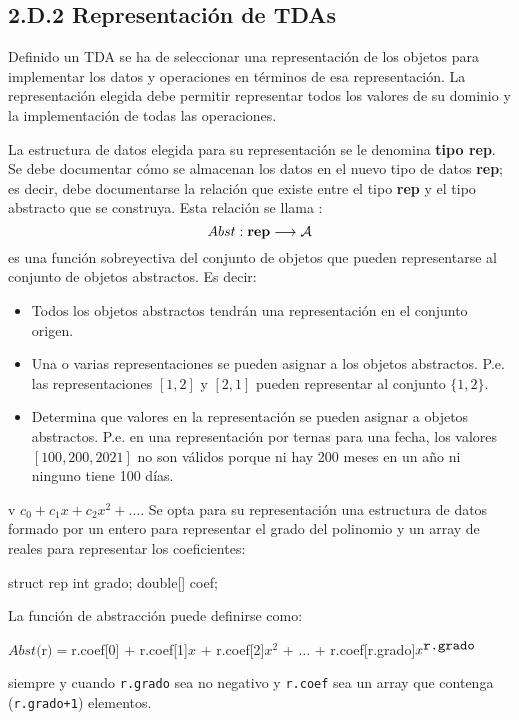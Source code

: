 \subsection*{2.D.2 Representación de TDAs}
\label{sec:representacionTDA}



Definido un TDA se ha de seleccionar una representación de los objetos para implementar los datos y operaciones en términos de esa representación. La representación elegida debe permitir representar todos los valores de su dominio y la implementación de  todas las operaciones.

La estructura de datos elegida para su representación se le denomina \textbf{tipo rep}. Se debe documentar cómo se almacenan los datos en el nuevo tipo de datos \textbf{rep}; es decir, debe documentarse la relación que existe entre el tipo \textbf{rep} y el tipo abstracto que se construya. Esta relación se llama :
$$
Abst: \mbox{\textbf{rep}} \longrightarrow {\cal A}
$$
es una función sobreyectiva del conjunto de objetos que pueden representarse al conjunto de objetos abstractos. Es decir:
\begin{itemize}
\item Todos los objetos abstractos tendrán una representación en el conjunto origen.
\item Una o varias representaciones se pueden asignar a los objetos abstractos. P.e. las representaciones $[1,2]$ y $[2,1]$ pueden representar al conjunto $\{1,2\}$.
\item Determina que valores en la representación se pueden asignar a objetos abstractos. P.e. en una representación por ternas para una fecha, los valores $[100,200,2021]$ no son válidos porque ni hay 200 meses en un año ni ninguno tiene 100 días.
\end{itemize}


\begin{example}
v $c_0+c_1x+c_2x^2+\ldots$.
Se opta para su representación una estructura de datos formado por un entero para representar el grado del polinomio y un array de reales para representar los coeficientes:
\begin{pyverbatim}
struct rep {
   int grado;
   double[] coef;
}
\end{pyverbatim}
La función de abstracción puede definirse como:

\centerline{\ttfamily 
$Abst($r$)=$r.coef[0] + r.coef[1]$x$ + r.coef[2]$x^2$ + $\ldots$ + r.coef[r.grado]$x^{\mbox{\texttt{r.grado}}}$
}
\noindent siempre y cuando \texttt{r.grado} sea no negativo y \texttt{r.coef} sea un array que contenga (\texttt{r.grado+1}) elementos.
\end{example}

